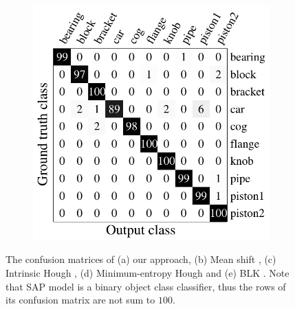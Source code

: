 \begin{figure}[ht]
\begin{subfigure}[t]{0.32\linewidth}
	\end{subfigure}
	\begin{subfigure}[t]{0.32\linewidth}
		\label{fig/reg/confusion_blk}
		\includegraphics[width=1\linewidth]{fig/reg/confusion_blk.pdf}
	\end{subfigure}
	\caption{The confusion matrices of (a) our approach, (b) Mean shift \cite{Pham2011}, (c) Intrinsic Hough \cite{Woodford2013}, (d) Minimum-entropy Hough \cite{Woodford2013} and (e) BLK \cite{Barinova2010}. Note that SAP model is a binary object class classifier, thus the rows of its confusion matrix are not sum to $100$.}
	\label{fig/reg/recresult3d}
\end{figure}





